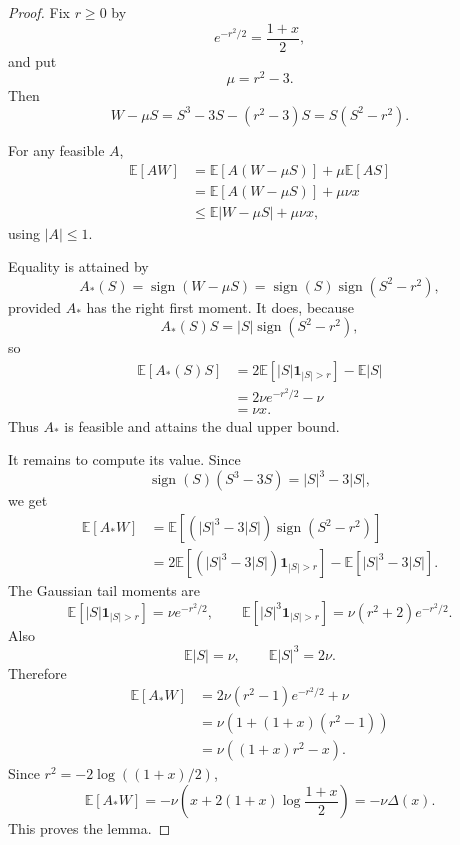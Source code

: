 \documentclass[11pt]{article}
\newcommand{\E}{\mathbb E}
\newcommand{\one}{\mathbf 1}
\newcommand{\sgn}{\operatorname{sign}}
\begin{document}
\begin{proof}
Fix $r\ge0$ by
\[
        e^{-r^2/2}=\frac{1+x}{2},
\]
and put
\[
        \mu=r^2-3.
\]
Then
\[
        W-\mu S=S^3-3S-(r^2-3)S=S(S^2-r^2).
\]

For any feasible $A$,
\begin{align*}
        \E[AW]
        &=\E[A(W-\mu S)]+\mu\E[AS]\\
        &=\E[A(W-\mu S)]+\mu\nu x\\
        &\le \E|W-\mu S|+\mu\nu x,
\end{align*}
using $|A|\le1$.

Equality is attained by
\[
        A_*(S)=\sgn(W-\mu S)=\sgn(S)\sgn(S^2-r^2),
\]
provided $A_*$ has the right first moment.  It does, because
\[
        A_*(S)S=|S|\sgn(S^2-r^2),
\]
so
\begin{align*}
        \E[A_*(S)S]
        &=2\E[|S|\one_{|S|>r}]-\E|S|\\
        &=2\nu e^{-r^2/2}-\nu\\
        &=\nu x.
\end{align*}
Thus $A_*$ is feasible and attains the dual upper bound.

It remains to compute its value.  Since
\[
        \sgn(S)(S^3-3S)=|S|^3-3|S|,
\]
we get
\begin{align*}
        \E[A_*W]
        &=\E[(|S|^3-3|S|)\sgn(S^2-r^2)]\\
        &=2\E[(|S|^3-3|S|)\one_{|S|>r}]
          -\E[|S|^3-3|S|].
\end{align*}
The Gaussian tail moments are
\[
        \E[|S|\one_{|S|>r}]=\nu e^{-r^2/2},
        \qquad
        \E[|S|^3\one_{|S|>r}]=\nu(r^2+2)e^{-r^2/2}.
\]
Also
\[
        \E|S|=\nu,
        \qquad
        \E|S|^3=2\nu.
\]
Therefore
\begin{align*}
        \E[A_*W]
        &=2\nu(r^2-1)e^{-r^2/2}+\nu\\
        &=\nu\left(1+(1+x)(r^2-1)\right)\\
        &=\nu\left((1+x)r^2-x\right).
\end{align*}
Since $r^2=-2\log((1+x)/2)$,
\[
        \E[A_*W]
        =-\nu\left(x+2(1+x)\log\frac{1+x}{2}\right)
        =-\nu\Delta(x).
\]
This proves the lemma.
\end{proof}
\end{document}
